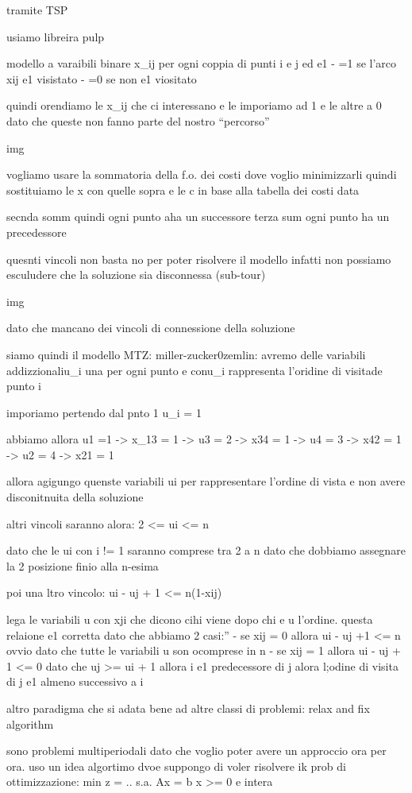 tramite TSP

usiamo libreira pulp


modello a varaibili binare x_{ij} per ogni coppia di punti i e j ed e1 
- =1 se l’arco x{ij} e1 visistato
- =0 se non e1 viositato

quindi orendiamo le x_{ij} che ci interessano e le imporiamo ad 1 e le altre a 0 dato che queste non fanno parte del nostro “percorso”

img

vogliamo usare la sommatoria {della f.o. }dei costi  dove voglio minimizzarli quindi sostituiamo le x con quelle sopra e le c in base alla tabella dei costi data

secnda somm quindi ogni punto aha un successore
terza sum ogni punto ha un precedessore

quesnti vincoli non basta no per poter risolvere il modello infatti non possiamo esculudere che la soluzione sia disconnessa (sub-tour)


img


dato che mancano dei vincoli di connessione della soluzione


siamo quindi il modello MTZ: miller-zucker0zemlin:
avremo delle variabili addizzionaliu_i una per ogni punto e conu_i rappresenta l’oridine di visitade punto i

imporiamo pertendo dal pnto 1
u_i = 1

abbiamo allora u1 =1 -> x_13 = 1 -> u3 = 2 -> x34 = 1 -> u4 = 3 -> x42 = 1 -> u2 = 4 -> x21 = 1

allora agigungo quenste variabili ui per rappresentare l’ordine di vista e non avere disconitnuita della soluzione

altri vincoli saranno alora:
2 <= ui <= n

dato che le ui con i != 1 saranno comprese tra 2 a n dato che dobbiamo assegnare la 2 posizione finio alla n-esima

poi una ltro vincolo:
ui - uj + 1 <= n(1-xij)

lega le variabili u con xji che dicono cihi viene dopo chi e u l’ordine. questa relaione e1 corretta dato che abbiamo 2 casi:”
- se xij = 0 allora ui - uj +1 <= n ovvio dato che tutte le variabili u son ocomprese in n 
- se xij = 1 allora ui - uj + 1 <= 0 dato che uj >= ui + 1 allora i e1 predecessore di j  alora l;odine di visita di j e1 almeno successivo a i


altro paradigma che si adata bene ad altre classi di problemi:
relax and fix algorithm

sono problemi multiperiodali dato che voglio poter avere un approccio ora per ora. uso un idea algortimo dvoe suppongo di voler risolvere ik prob di ottimizzazione:
min z = ..
s.a.
Ax = b
x >= 0 e intera

